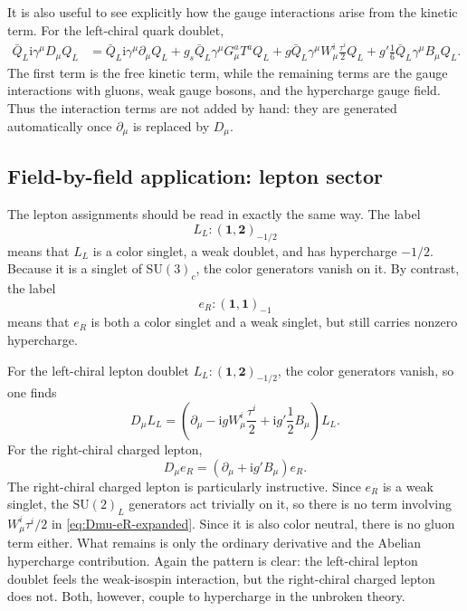 \documentclass[11pt,a4paper]{article}
\newcommand{\ii}{\mathrm{i}}
\newcommand{\p}{\partial}
\newcommand{\gmu}{\gamma^\mu}
\newcommand{\SUc}{\mathrm{SU}(3)_c}
\newcommand{\SUw}{\mathrm{SU}(2)_L}
\begin{document}
It is also useful to see explicitly how the gauge interactions arise from the kinetic term. For the left-chiral quark doublet,
\begin{align}
	\bar Q_L \ii \gmu D_\mu Q_L
	&=
	\bar Q_L \ii \gmu \p_\mu Q_L
	+ g_s \bar Q_L \gmu G_\mu^a T^a Q_L
	+ g \bar Q_L \gmu W_\mu^i \frac{\tau^i}{2} Q_L
	+ g' \frac16 \bar Q_L \gmu B_\mu Q_L.
	\label{eq:QL-kinetic-expanded-to-interactions}
\end{align}
The first term is the free kinetic term, while the remaining terms are the gauge interactions with gluons, weak gauge bosons, and the hypercharge gauge field. Thus the interaction terms are not added by hand: they are generated automatically once \(\p_\mu\) is replaced by \(D_\mu\).


\subsection{Field-by-field application: lepton sector}

The lepton assignments should be read in exactly the same way. The label
\[
L_L:(\mathbf{1},\mathbf{2})_{-1/2}
\]
means that \(L_L\) is a color singlet, a weak doublet, and has hypercharge \(-1/2\). Because it is a singlet of \(\SUc\), the color generators vanish on it. By contrast, the label
\[
e_R:(\mathbf{1},\mathbf{1})_{-1}
\]
means that \(e_R\) is both a color singlet and a weak singlet, but still carries nonzero hypercharge.

For the left-chiral lepton doublet \(L_L:(\mathbf{1},\mathbf{2})_{-1/2}\), the color generators vanish, so one finds
\begin{equation}
D_\mu L_L=
\left(
\p_\mu-\ii gW_\mu^i\frac{\tau^i}{2}+\ii g'\frac12 B_\mu
\right)L_L.
\label{eq:Dmu-LL-expanded}
\end{equation}
For the right-chiral charged lepton,
\begin{equation}
D_\mu e_R=(\p_\mu+\ii g'B_\mu)e_R.
\label{eq:Dmu-eR-expanded}
\end{equation}
The right-chiral charged lepton is particularly instructive. Since \(e_R\) is a weak singlet, the \(\SUw\) generators act trivially on it, so there is no term involving \(W_\mu^i\tau^i/2\) in \eqref{eq:Dmu-eR-expanded}. Since it is also color neutral, there is no gluon term either. What remains is only the ordinary derivative and the Abelian hypercharge contribution.  
Again the pattern is clear: the left-chiral lepton doublet feels the weak-isospin interaction, but the right-chiral charged lepton does not. Both, however, couple to hypercharge in the unbroken theory.
\end{document}
